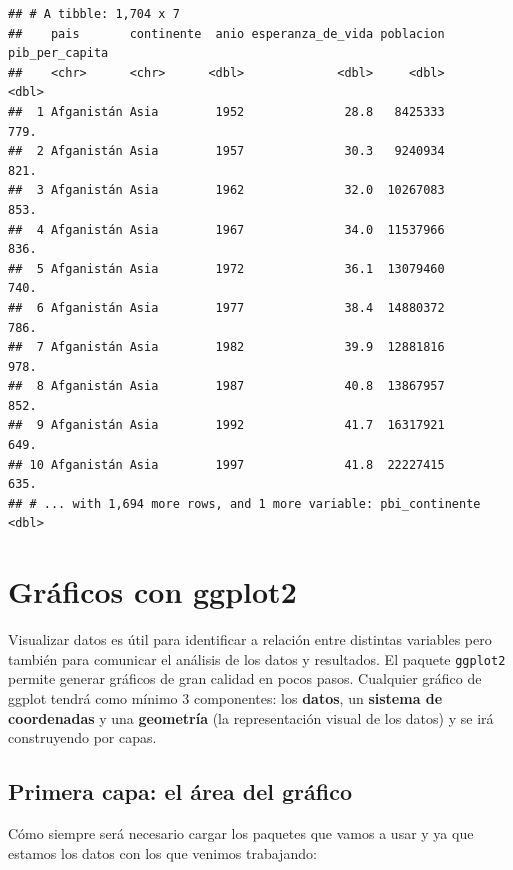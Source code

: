 \documentclass[
  openany]{book}
\begin{document}
\begin{verbatim}
## # A tibble: 1,704 x 7
##    pais       continente  anio esperanza_de_vida poblacion pib_per_capita
##    <chr>      <chr>      <dbl>             <dbl>     <dbl>          <dbl>
##  1 Afganistán Asia        1952              28.8   8425333           779.
##  2 Afganistán Asia        1957              30.3   9240934           821.
##  3 Afganistán Asia        1962              32.0  10267083           853.
##  4 Afganistán Asia        1967              34.0  11537966           836.
##  5 Afganistán Asia        1972              36.1  13079460           740.
##  6 Afganistán Asia        1977              38.4  14880372           786.
##  7 Afganistán Asia        1982              39.9  12881816           978.
##  8 Afganistán Asia        1987              40.8  13867957           852.
##  9 Afganistán Asia        1992              41.7  16317921           649.
## 10 Afganistán Asia        1997              41.8  22227415           635.
## # ... with 1,694 more rows, and 1 more variable: pbi_continente <dbl>
\end{verbatim}

\hypertarget{gruxe1ficos-con-ggplot2}{%
\chapter{Gráficos con ggplot2}\label{gruxe1ficos-con-ggplot2}}

Visualizar datos es útil para identificar a relación entre distintas variables pero también para comunicar el análisis de los datos y resultados.
El paquete \texttt{ggplot2} permite generar gráficos de gran calidad en pocos pasos.
Cualquier gráfico de ggplot tendrá como mínimo 3 componentes: los \textbf{datos}, un \textbf{sistema de coordenadas} y una \textbf{geometría} (la representación visual de los datos) y se irá construyendo por capas.

\hypertarget{primera-capa-el-uxe1rea-del-gruxe1fico}{%
\section{Primera capa: el área del gráfico}\label{primera-capa-el-uxe1rea-del-gruxe1fico}}

Cómo siempre será necesario cargar los paquetes que vamos a usar y ya que estamos los datos con los que venimos trabajando:
\end{document}
